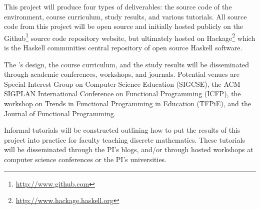 This project will produce four types of deliverables: the source code
of the \thelang{} environment, course curriculum, study results, and
various tutorials.  All source code from this project will be open
source and initially hosted publicly on the
Github\footnote{\url{http://www.github.com}} source code repository
website, but ultimately hosted on
Hackage\footnote{\url{http://www.hackage.haskell.org}} which is the
Haskell communities central repository of open source Haskell
software.

The \thelang{}'s design, the course curriculum, and the study results
will be disseminated through academic conferences, workshops, and
journals.  Potential venues are Special Interest Group on Computer
Science Education (SIGCSE), the ACM SIGPLAN International Conference
on Functional Programming (ICFP), the workshop on Trends in Functional
Programming in Education (TFPiE), and the Journal of Functional
Programming.

Informal tutorials will be constructed outlining how to put the
results of this project into practice for faculty teaching discrete
mathematics.  These tutorials will be disseminated through the PI's
blogs, and/or through hosted workshops at computer science conferences
or the PI's universities.

